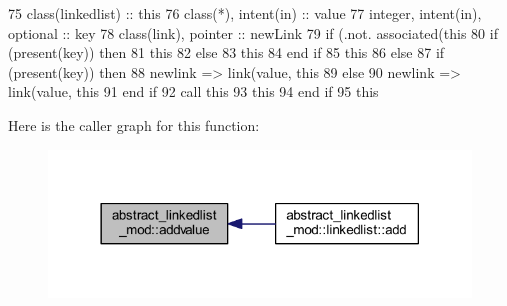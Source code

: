 \begin{DoxyCode}
75     \textcolor{keywordtype}{class}(linkedlist) :: this
76     \textcolor{keywordtype}{class}(*), \textcolor{keywordtype}{intent(in)} :: value
77     \textcolor{keywordtype}{integer}, \textcolor{keywordtype}{intent(in)}, \textcolor{keywordtype}{optional} :: key
78     \textcolor{keywordtype}{class}(link), \textcolor{keywordtype}{pointer} :: newLink
79     \textcolor{keywordflow}{if} (.not. \textcolor{keyword}{associated}(this%
80         \textcolor{keywordflow}{if} (\textcolor{keyword}{present}(key)) \textcolor{keywordflow}{then}
81             this%
82         \textcolor{keywordflow}{else}
83             this%
84 \textcolor{keywordflow}{        end if}
85         this%
86     \textcolor{keywordflow}{else}
87         \textcolor{keywordflow}{if} (\textcolor{keyword}{present}(key)) \textcolor{keywordflow}{then}
88             newlink => link(\textcolor{keywordtype}{value}, this%
89         \textcolor{keywordflow}{else}
90             newlink => link(\textcolor{keywordtype}{value}, this%
91 \textcolor{keywordflow}{        end if}
92         \textcolor{keyword}{call }this%
93         this%
94 \textcolor{keywordflow}{    end if}
95     this%
\end{DoxyCode}
Here is the caller graph for this function\+:
\nopagebreak
\begin{figure}[H]
\begin{center}
\leavevmode
\includegraphics[width=318pt]{namespaceabstract__linkedlist__mod_a1075e2f234dacc9daf8407e14fac0929_icgraph}
\end{center}
\end{figure}
\mbox{\label{namespaceabstract__linkedlist__mod_a87a81a4be29c8d4e8d2fb0d02247033b}} 

